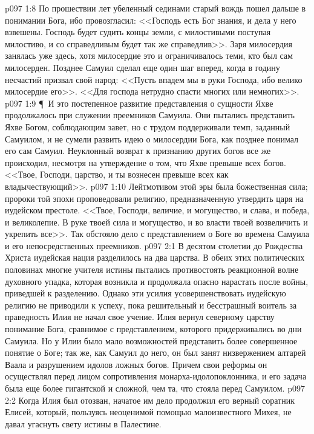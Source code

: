 \vs p097 1:8 По прошествии лет убеленный сединами старый вождь пошел дальше в понимании Бога, ибо провозгласил: <<Господь есть Бог знания, и дела у него взвешены. Господь будет судить концы земли, с милостивыми поступая милостиво, и со справедливым будет так же справедлив>>. Заря милосердия занялась уже здесь, хотя милосердие это и ограничивалось теми, кто был сам милосерден. Позднее Самуил сделал еще один шаг вперед, когда в годину несчастий призвал свой народ: <<Пусть впадем мы в руки Господа, ибо велико милосердие его>>. <<Для господа нетрудно спасти многих или немногих>>.
\vs p097 1:9 \P\ И это постепенное развитие представления о сущности Яхве продолжалось при служении преемников Самуила. Они пытались представить Яхве Богом, соблюдающим завет, но с трудом поддерживали темп, заданный Самуилом, и не сумели развить идею о милосердии Бога, как позднее понимал его сам Самуил. Неуклонный возврат к признанию других богов все же происходил, несмотря на утверждение о том, что Яхве превыше всех богов. <<Твое, Господи, царство, и ты вознесен превыше всех как владычествующий>>.
\vs p097 1:10 Лейтмотивом этой эры была божественная сила; пророки той эпохи проповедовали религию, предназначенную утвердить царя на иудейском престоле. <<Твое, Господи, величие, и могущество, и слава, и победа, и великолепие. В руке твоей сила и могущество, и во власти твоей возвеличить и укрепить все>>. Так обстояло дело с представлением о Боге во времена Самуила и его непосредственных преемников.
\vs p097 2:1 В десятом столетии до Рождества Христа иудейская нация разделилось на два царства. В обеих этих политических половинах многие учителя истины пытались противостоять реакционной волне духовного упадка, которая возникла и продолжала опасно нарастать после войны, приведшей к разделению. Однако эти усилия усовершенствовать иудейскую религию не приводили к успеху, пока решительный и бесстрашный воитель за праведность Илия не начал свое учение. Илия вернул северному царству понимание Бога, сравнимое с представлением, которого придерживались во дни Самуила. Но у Илии было мало возможностей представить более совершенное понятие о Боге; так же, как Самуил до него, он был занят низвержением алтарей Ваала и разрушением идолов ложных богов. Причем свои реформы он осуществлял перед лицом сопротивления монарха\hyp{}идолопоклонника, и его задача была еще более гигантской и сложной, чем та, что стояла перед Самуилом.
\vs p097 2:2 Когда Илия был отозван, начатое им дело продолжил его верный соратник Елисей, который, пользуясь неоценимой помощью малоизвестного Михея, не давал угаснуть свету истины в Палестине.
